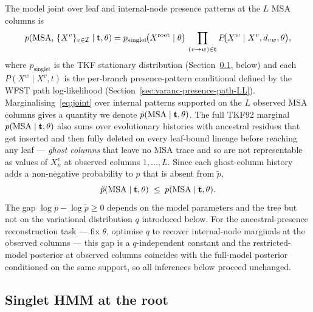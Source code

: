 The model joint over leaf and internal-node presence patterns at the
$L$ MSA columns is
\begin{equation}
\label{eq:joint}
p(\text{MSA},\, \{X^v\}_{v \in \mathcal{I}} \mid \mathbf{t}, \theta)
= p_{\text{singlet}}\!\big(X^{\text{root}} \mid \theta\big)\,
   \prod_{(v \to w) \in \mathbf{t}}
   P\!\big(X^w \mid X^v, d_{vw}, \theta\big),
\end{equation}
where $p_{\text{singlet}}$ is the TKF stationary distribution
(Section~\ref{sec:varanc-presence-singlet}, below) and each
$P(X^w \mid X^v, t)$ is the per-branch presence-pattern conditional
defined by the WFST path log-likelihood
(Section~\ref{sec:varanc-presence-path-LL}).
Marginalising~\eqref{eq:joint} over internal patterns supported on
the $L$ observed MSA columns gives a quantity we denote
$\tilde{p}(\text{MSA} \mid \mathbf{t}, \theta)$.
The full TKF92 marginal $p(\text{MSA} \mid \mathbf{t}, \theta)$ also
sums over evolutionary histories with ancestral residues that get
inserted and then fully deleted on every leaf-bound lineage before
reaching any leaf — \emph{ghost columns} that leave no MSA trace
and so are not representable as values of $X^v_n$ at observed
columns $1, \ldots, L$.
Since each ghost-column history adds a non-negative probability to
$p$ that is absent from $\tilde{p}$,
\begin{equation}
\label{eq:tildep-le-p}
\tilde{p}(\text{MSA} \mid \mathbf{t}, \theta)
\;\leq\;
p(\text{MSA} \mid \mathbf{t}, \theta).
\end{equation}
The gap $\log p - \log \tilde{p} \geq 0$ depends on the model
parameters and the tree but not on the variational distribution $q$
introduced below.
For the ancestral-presence reconstruction task — fix $\theta$,
optimise $q$ to recover internal-node marginals at the observed
columns — this gap is a $q$-independent constant and the
restricted-model posterior at observed columns coincides with the
full-model posterior conditioned on the same support, so all
inferences below proceed unchanged.

\subsection{Singlet HMM at the root}
\label{sec:varanc-presence-singlet}

